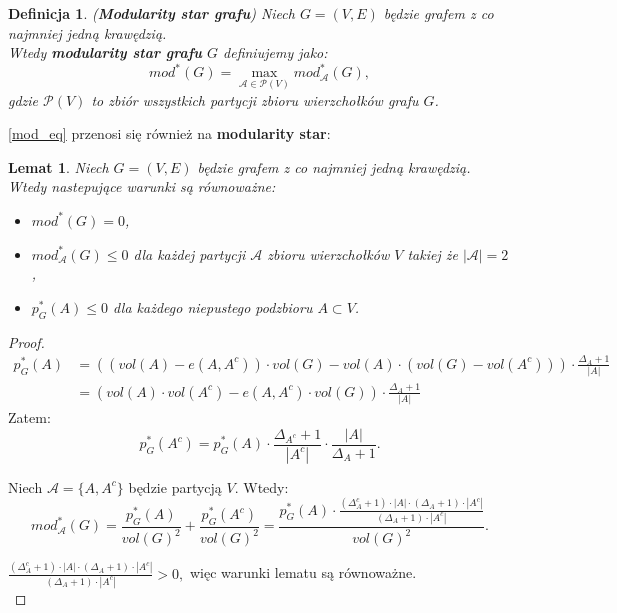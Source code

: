 \documentclass[letterpaper,12pt]{article}
\newtheorem{definition}{Definicja}
\newtheorem{lemma}{Lemat}
\begin{document}
  \begin{definition}
    (\textbf{Modularity star grafu}) Niech \(G = (V, E)\) będzie grafem z co najmniej jedną krawędzią.\\
    Wtedy \textbf{modularity star grafu} \(G\) definiujemy jako:
    \[
    mod^*(G) = \max_{\mathcal{A} \in \mathcal{P}(V)} mod^*_{\mathcal{A}}(G),
    \]
    gdzie \(\mathcal{P}(V)\) to zbiór wszystkich partycji zbioru wierzchołków grafu \(G\).
  \end{definition}

  \cref{mod_eq} przenosi się również na \textbf{modularity star}:
  \begin{lemma}
    \label{mod_star_eq}
    Niech \(G = (V,E)\) będzie grafem z co najmniej jedną krawędzią. Wtedy nastepujące warunki są równoważne:
    \begin{itemize}
      \item \(mod^*(G) = 0\),
      \item \(mod^*_{\mathcal{A}}(G) \leq 0\) dla każdej partycji \(\mathcal{A}\) zbioru wierzchołków \(V\) takiej że \(|\mathcal{A}| = 2\),
      \item \(p_G^*(A) \leq 0\) dla każdego niepustego podzbioru \(A \subset V\).
    \end{itemize}
  \end{lemma}

  \begin{proof}
    \begin{align*}
      p_G^*(A) &= \left(\left(vol(A) - e(A, A^c)\right) \cdot vol(G) - vol(A) \cdot \left(vol(G)-vol(A^c)\right)\right) \cdot \frac{\Delta_A + 1}{|A|} \\
      &= \left(vol(A) \cdot vol(A^c) - e(A, A^c) \cdot vol(G) \right) \cdot \frac{\Delta_A + 1}{|A|}
    \end{align*}
    Zatem:
    \[
      p_G^*(A^c) = p_G^*(A) \cdot \frac{\Delta_{A^c} + 1}{|A^c|} \cdot \frac{|A|}{\Delta_A + 1}.
    \]

    Niech \(\mathcal{A} = \{A, A^c\}\) będzie partycją \(V\). Wtedy:
    \[mod_{\mathcal{A}}^*(G) = \frac{p_G^*(A)}{vol(G)^2} + \frac{p_G^*(A^c)}{vol(G)^2} = \frac{p_G^*(A)\cdot \frac{(\Delta_A^c + 1) \cdot |A| \cdot (\Delta_A + 1) \cdot |A^c|}{(\Delta_A + 1) \cdot |A^c|}}{vol(G)^2}.\]

    \(\frac{(\Delta_A^c + 1) \cdot |A| \cdot (\Delta_A + 1) \cdot |A^c|}{(\Delta_A + 1) \cdot |A^c|} > 0,\) więc warunki lematu są równoważne.\\
  \end{proof}
\end{document}
